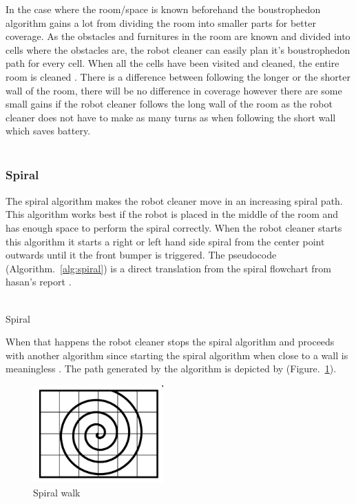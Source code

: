 \documentclass[bachelor]{kththesis}
\begin{document}
\noindent In the case where the room/space is known beforehand the boustrophedon algorithm gains a lot from dividing the room into smaller parts for better coverage. As the obstacles and furnitures in the room are known and divided into cells where the obstacles are, the robot cleaner can easily plan it's boustrophedon path for every cell. When all the cells have been visited and cleaned, the entire room is cleaned \parencite{choset}. There is a difference between following the longer or the shorter wall of the room, there will be no difference in coverage however there are some small gains if the robot cleaner follows the long wall of the room as the robot cleaner does not have to make as many turns as when following the short wall which saves battery.
\\\\

\subsubsection{Spiral}
The spiral algorithm makes the robot cleaner move in an increasing spiral path. This algorithm works best if the robot is placed in the middle of the room and has enough space to perform the spiral correctly. When the robot cleaner starts this algorithm it starts a right or left hand side spiral from the center point outwards until it the front bumper is triggered. 
 The pseudocode (Algorithm.~\ref{alg:spiral}) is a direct translation from the spiral flowchart from hasan's report \parencite{hasan}.
\\\\
\begin{algorithm}[H]
	\SetAlgoLined

	\caption{Spiral \parencite{hasan}}
	\label{alg:spiral}
	
\end{algorithm}
\bigskip
When that happens the robot cleaner stops the spiral algorithm and proceeds with another algorithm since starting the spiral algorithm when close to a wall is meaningless \parencite{hasan}.
The path generated by the algorithm is depicted by (Figure.~\ref{fig:3}).
\begin{figure}[H]
	\includegraphics[width=5cm]{img/spiral.png}
	\centering
	\caption{Spiral walk}
	\label{fig:3}
\end{figure}
\end{document}
